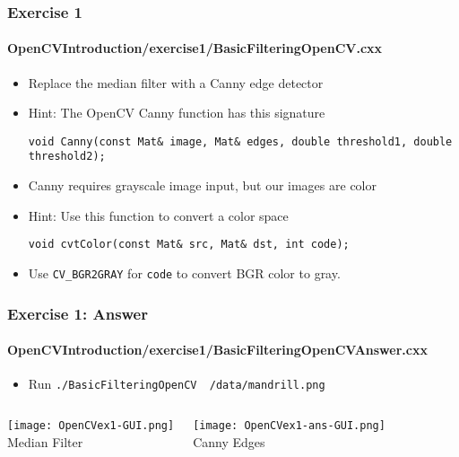 \begin{frame}[fragile]
\frametitle{Exercise 1}
\framesubtitle{OpenCVIntroduction/exercise1/BasicFilteringOpenCV.cxx}
\begin{center}
\begin{itemize}
\item Replace the median filter with a Canny edge detector
\pause
\item Hint: The OpenCV Canny function has this signature
\begin{lstlisting}[numbers=none,xleftmargin=0pt]
void Canny(const Mat& image, Mat& edges, double threshold1, double threshold2);
\end{lstlisting}
\pause
\item Canny requires grayscale image input, but our images are color
\item Hint: Use this function to convert a color space
\begin{lstlisting}[numbers=none,xleftmargin=0pt]
void cvtColor(const Mat& src, Mat& dst, int code);
\end{lstlisting}
\item Use {\tt CV\_BGR2GRAY} for {\tt code} to convert BGR color to gray.
\end{itemize}
\end{center}
\end{frame}


\begin{frame}
\frametitle{Exercise 1: Answer}
\framesubtitle{OpenCVIntroduction/exercise1/BasicFilteringOpenCVAnswer.cxx}
\begin{center}
\begin{itemize}
\item Run {\tt ./BasicFilteringOpenCV ~/data/mandrill.png}
\end{itemize}
\begin{columns}[c]
\begin{center}
\texttt{[image: OpenCVex1-GUI.png]} \\
Median Filter
\end{center}
\begin{center}
\texttt{[image: OpenCVex1-ans-GUI.png]} \\
Canny Edges
\end{center}
\end{columns}
\end{center}
\end{frame}


